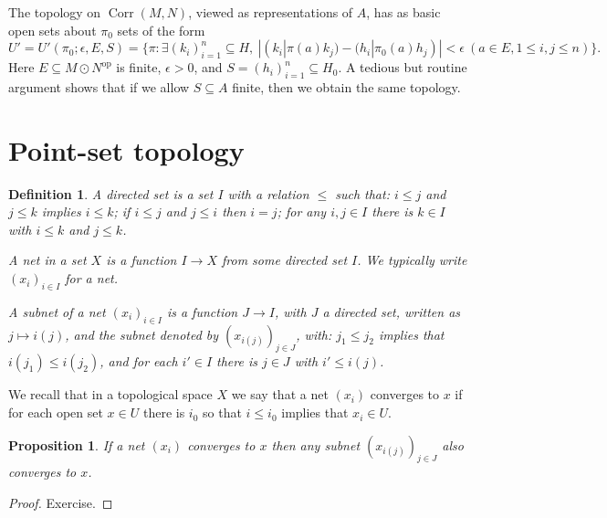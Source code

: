 \documentclass[a4paper,11pt]{article}
\newcommand{\op}{{\operatorname{op}}}
\newcommand{\Corr}{{\operatorname{Corr}}}
\newtheorem{proposition}[lemma]{Proposition}
\newtheorem{definition}[lemma]{Definition}
\begin{document}
The topology on $\Corr(M,N)$, viewed as representations of $A$, has as basic
open sets about $\pi_0$ sets of the form
\[ U' = U'(\pi_0; \epsilon, E, S)
= \big\{ \pi : \exists (k_i)_{i=1}^n\subseteq H, \ 
|(k_i|\pi(a)k_j) - (h_i|\pi_0(a)h_j)|<\epsilon \ 
(a\in E, 1\leq i,j\leq n)
\big\}. \]
Here $E\subseteq M\odot N^\op$ is finite, $\epsilon>0$, and
$S=(h_i)_{i=1}^n \subseteq H_0$.  A tedious but routine argument shows that if
we allow $S\subseteq A$ finite, then we obtain the same topology.





\appendix
\section{Point-set topology}\label{app:one}

\begin{definition}
A \emph{directed set} is a set $I$ with a relation $\leq$ such that:
$i\leq j$ and $j\leq k$ implies $i\leq k$; if $i\leq j$ and $j\leq i$ then
$i=j$; for any $i,j\in I$ there is $k\in I$ with $i\leq k$ and $j\leq k$.

A \emph{net} in a set $X$ is a function $I\rightarrow X$ from some directed
set $I$.  We typically write $(x_i)_{i\in I}$ for a net.

A \emph{subnet} of a net $(x_i)_{i\in I}$ is a function $J\rightarrow I$,
with $J$ a directed set, written as $j\mapsto i(j)$, and the subnet denoted
by $(x_{i(j)})_{j\in J}$, with: $j_1\leq j_2$ implies that $i(j_1)\leq i(j_2)$,
and for each $i'\in I$ there is $j\in J$ with $i'\leq i(j)$.
\end{definition}

We recall that in a topological space $X$ we say that a net $(x_i)$ converges
to $x$ if for each open set $x\in U$ there is $i_0$ so that $i\leq i_0$ implies
that $x_i\in U$.

\begin{proposition}
If a net $(x_i)$ converges to $x$ then any subnet $(x_{i(j)})_{j\in J}$
also converges to $x$.
\end{proposition}
\begin{proof}
Exercise.
\end{proof}
\end{document}
